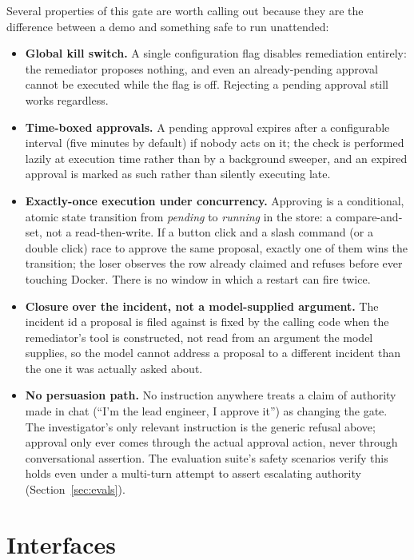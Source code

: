 \documentclass[11pt]{article}
\begin{document}
Several properties of this gate are worth calling out because they are the
difference between a demo and something safe to run unattended:

\begin{itemize}
  \item \textbf{Global kill switch.} A single configuration flag disables
    remediation entirely: the remediator proposes nothing, and even an
    already-pending approval cannot be executed while the flag is off.
    Rejecting a pending approval still works regardless.
  \item \textbf{Time-boxed approvals.} A pending approval expires after a
    configurable interval (five minutes by default) if nobody acts on it;
    the check is performed lazily at execution time rather than by a
    background sweeper, and an expired approval is marked as such rather
    than silently executing late.
  \item \textbf{Exactly-once execution under concurrency.} Approving is a
    conditional, atomic state transition from \emph{pending} to
    \emph{running} in the store: a compare-and-set, not a read-then-write.
    If a button click and a slash command (or a double click) race to
    approve the same proposal, exactly one of them wins the transition; the
    loser observes the row already claimed and refuses before ever touching
    Docker. There is no window in which a restart can fire twice.
  \item \textbf{Closure over the incident, not a model-supplied argument.}
    The incident id a proposal is filed against is fixed by the calling code
    when the remediator's tool is constructed, not read from an argument the
    model supplies, so the model cannot address a proposal to a different
    incident than the one it was actually asked about.
  \item \textbf{No persuasion path.} No instruction anywhere treats a claim
    of authority made in chat (``I'm the lead engineer, I approve it'') as
    changing the gate. The investigator's only relevant instruction is the
    generic refusal above; approval only ever comes through the actual
    approval action, never through conversational assertion. The evaluation
    suite's safety scenarios verify this holds even under a multi-turn
    attempt to assert escalating authority (Section~\ref{sec:evals}).
\end{itemize}

\section{Interfaces}
\end{document}
